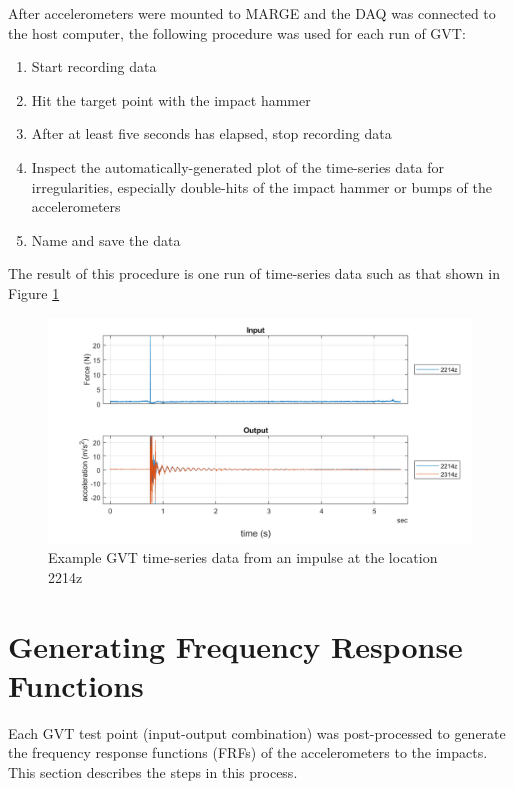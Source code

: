 After accelerometers were mounted to MARGE and the DAQ was connected to the host computer, the following procedure was used for each run of GVT:
\begin{enumerate}
	\item Start recording data
	\item Hit the target point with the impact hammer
	\item After at least five seconds has elapsed, stop recording data
	\item Inspect the automatically-generated plot of the time-series data for irregularities, especially double-hits of the impact hammer or bumps of the accelerometers
	\item Name and save the data
\end{enumerate}
The result of this procedure is one run of time-series data such as that shown in Figure \ref{fig:gvtTimeExample}
\begin{figure}[H]
	\centering
	\includegraphics[width=6in]{figs/sampleGVT.png}
	\caption{Example GVT time-series data from an impulse at the location 2214z}
	\label{fig:gvtTimeExample}
\end{figure}

\section{Generating Frequency Response Functions} %
\label{sec:generateFRF}

Each GVT test point (input-output combination) was post-processed to generate the frequency response functions (FRFs) of the accelerometers to the impacts. This section describes the steps in this process.

